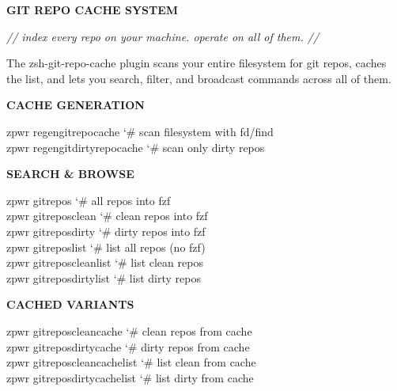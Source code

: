 \documentclass[11pt,a4paper,twoside]{book}
\begin{document}
\vspace{10pt}
{\large\bfseries\color{neoncyan} GIT REPO CACHE SYSTEM}\vspace{6pt}

{\small\itshape\color{dimtext} // index every repo on your machine. operate on all of them. //}

The zsh-git-repo-cache plugin scans your entire filesystem for git repos, caches the list, and lets you search, filter, and broadcast commands across all of them.


\vspace{12pt}
{\bfseries\color{neonyellow} CACHE GENERATION}\vspace{4pt}

\begin{codebox}
\color{neongreen}zpwr regengitrepocache      {\char`\#} scan filesystem with fd/find\\
\color{neongreen}zpwr regengitdirtyrepocache  {\char`\#} scan only dirty repos\\
\end{codebox}


\vspace{12pt}
{\bfseries\color{neonyellow} SEARCH \& BROWSE}\vspace{4pt}

\begin{codebox}
\color{neongreen}zpwr gitrepos               {\char`\#} all repos into fzf\\
\color{neongreen}zpwr gitreposclean          {\char`\#} clean repos into fzf\\
\color{neongreen}zpwr gitreposdirty          {\char`\#} dirty repos into fzf\\
\color{neongreen}zpwr gitreposlist           {\char`\#} list all repos (no fzf)\\
\color{neongreen}zpwr gitreposcleanlist      {\char`\#} list clean repos\\
\color{neongreen}zpwr gitreposdirtylist      {\char`\#} list dirty repos\\
\end{codebox}


\vspace{12pt}
{\bfseries\color{neonyellow} CACHED VARIANTS}\vspace{4pt}

\begin{codebox}
\color{neongreen}zpwr gitreposcleancache     {\char`\#} clean repos from cache\\
\color{neongreen}zpwr gitreposdirtycache     {\char`\#} dirty repos from cache\\
\color{neongreen}zpwr gitreposcleancachelist  {\char`\#} list clean from cache\\
\color{neongreen}zpwr gitreposdirtycachelist  {\char`\#} list dirty from cache\\
\end{codebox}
\end{document}
